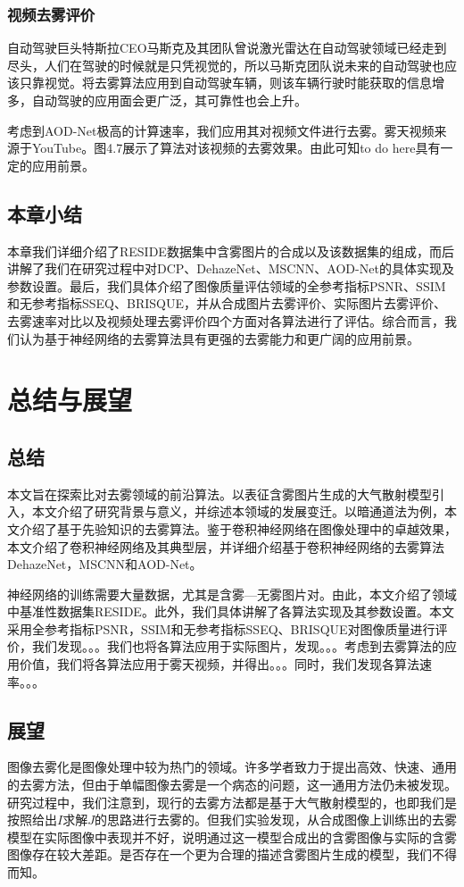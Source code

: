 \documentclass[a4paper, 12pt, oneside]{report}
\begin{document}
{\subsection{视频去雾评价\quad}
自动驾驶巨头特斯拉CEO马斯克及其团队曾说激光雷达在自动驾驶领域已经走到尽头，人们在驾驶的时候就是只凭视觉的，所以马斯克团队说未来的自动驾驶也应该只靠视觉。将去雾算法应用到自动驾驶车辆，则该车辆行驶时能获取的信息增多，自动驾驶的应用面会更广泛，其可靠性也会上升。

考虑到AOD-Net极高的计算速率，我们应用其对视频文件进行去雾。雾天视频来源于YouTube\cite{ref27}。图4.7展示了算法对该视频的去雾效果。由此可知to do here具有一定的应用前景。

\section{本章小结\quad}
本章我们详细介绍了RESIDE数据集中含雾图片的合成以及该数据集的组成，而后讲解了我们在研究过程中对DCP、DehazeNet、MSCNN、AOD-Net的具体实现及参数设置。最后，我们具体介绍了图像质量评估领域的全参考指标PSNR、SSIM和无参考指标SSEQ、BRISQUE，并从合成图片去雾评价、实际图片去雾评价、去雾速率对比以及视频处理去雾评价四个方面对各算法进行了评估。综合而言，我们认为基于神经网络的去雾算法具有更强的去雾能力和更广阔的应用前景。

\chapter{总结与展望\quad}
\section{总结\quad}
本文旨在探索比对去雾领域的前沿算法。以表征含雾图片生成的大气散射模型引入，本文介绍了研究背景与意义，并综述本领域的发展变迁。以暗通道法为例，本文介绍了基于先验知识的去雾算法。鉴于卷积神经网络在图像处理中的卓越效果，本文介绍了卷积神经网络及其典型层，并详细介绍基于卷积神经网络的去雾算法DehazeNet，MSCNN和AOD-Net。

神经网络的训练需要大量数据，尤其是含雾—无雾图片对。由此，本文介绍了领域中基准性数据集RESIDE。此外，我们具体讲解了各算法实现及其参数设置。本文采用全参考指标PSNR，SSIM和无参考指标SSEQ、BRISQUE对图像质量进行评价，我们发现。。。我们也将各算法应用于实际图片，发现。。。考虑到去雾算法的应用价值，我们将各算法应用于雾天视频，并得出。。。同时，我们发现各算法速率。。。
	
\section{展望\quad}
图像去雾化是图像处理中较为热门的领域。许多学者致力于提出高效、快速、通用的去雾方法，但由于单幅图像去雾是一个病态的问题，这一通用方法仍未被发现。研究过程中，我们注意到，现行的去雾方法都是基于大气散射模型的，也即我们是按照给出$I$求解$J$的思路进行去雾的。但我们实验发现，从合成图像上训练出的去雾模型在实际图像中表现并不好，说明通过这一模型合成出的含雾图像与实际的含雾图像存在较大差距。是否存在一个更为合理的描述含雾图片生成的模型，我们不得而知。

}
\end{document}
